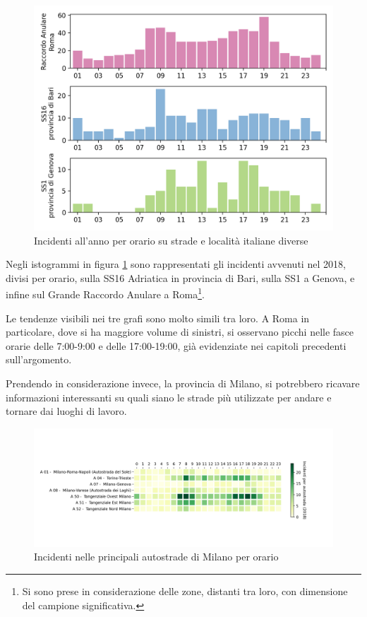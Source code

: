 \documentclass[a4paper,12pt]{report}
\begin{document}
\begin{figure}
    \includegraphics[width=\linewidth]{../src/incidenti/incidenti_aci/orari/orari.png}
    \caption{Incidenti all'anno per orario su strade e località italiane diverse}
    \label{fig:orari-strade-aci}
\end{figure}

Negli istogrammi in figura \ref{fig:orari-strade-aci} sono rappresentati 
gli incidenti avvenuti 
nel 2018, divisi per orario, sulla SS16 Adriatica in provincia di Bari, sulla SS1 
a Genova, e infine sul Grande Raccordo Anulare a 
Roma\footnote{Si sono prese in considerazione delle zone, distanti tra loro, 
con dimensione del campione significativa.}. 

Le tendenze visibili nei tre grafi sono molto simili tra loro. 
A Roma in particolare, dove si ha maggiore 
volume di sinistri, si osservano picchi nelle fasce orarie delle 
7:00-9:00 e delle 17:00-19:00, già evidenziate nei capitoli precedenti sull'argomento. 

Prendendo in considerazione invece, la provincia di Milano, si potrebbero ricavare 
informazioni interessanti su quali siano le strade più utilizzate per 
andare e tornare dai luoghi di lavoro. 

\begin{figure}
    \includegraphics[width=\linewidth]{../src/incidenti/incidenti_aci/orari/tangenziali_autostrade.png}
    \caption{Incidenti nelle principali autostrade di Milano per orario}
    \label{fig:tangenziali-autostrade}
\end{figure}
\end{document}
